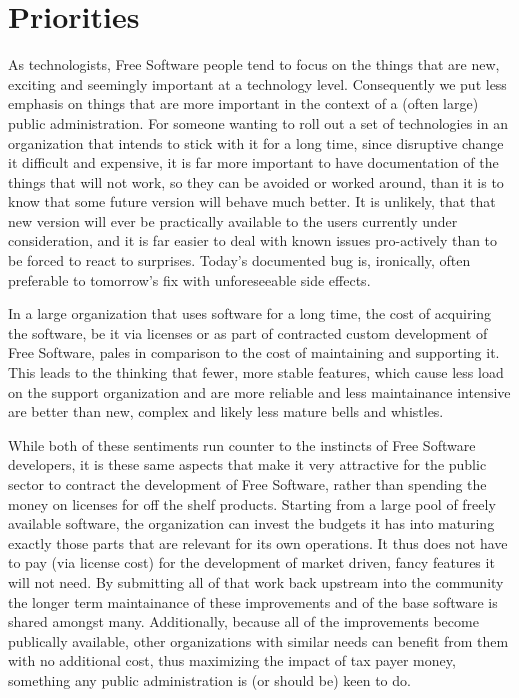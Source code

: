 \section*{Priorities}

As technologists, Free Software people tend to focus on the things that are
new, exciting and seemingly important at a technology level. Consequently we
put less emphasis on things that are more important in the context of a (often
large) public administration. For someone wanting to roll out a
set of technologies in an organization that intends to stick with it for a long
time, since disruptive change it difficult and expensive, it is far more
important to have documentation of the things that will not work, so they can
be avoided or worked around, than it is to know that some future version will
behave much better. It is unlikely, that that new version will ever be
practically available to the users currently under consideration, and it is far
easier to deal with known issues pro-actively than to be forced to react to
surprises.  Today's documented bug is, ironically, often preferable to
tomorrow's fix with unforeseeable side effects.

In a large organization that uses software for a long time, the cost of acquiring
the software, be it via licenses or as part of contracted custom development of
Free Software, pales in comparison to the cost of maintaining and supporting it.
This leads to the thinking that fewer, more stable features, which cause less load
on the support organization and are more reliable and less maintainance intensive
are better than new, complex and likely less mature bells and whistles.

While both of these sentiments run counter to the instincts of Free Software
developers, it is these same aspects that make it very attractive for the
public sector to contract the development of Free Software, rather than
spending the money on licenses for off the shelf products. Starting from a
large pool of freely available software, the organization can invest the
budgets it has into maturing exactly those parts that are relevant for its own
operations. It thus does not have to pay (via license cost) for the development of
market driven, fancy features it will not need. By submitting all of that work
back upstream into the community the longer term maintainance of these
improvements and of the base software is shared amongst many. Additionally,
because all of the improvements become publically available, other
organizations with similar needs can benefit from them with no
additional cost, thus maximizing the impact of tax payer money,
something any public administration is (or should be) keen to do.

